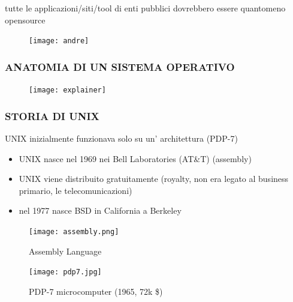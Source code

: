 \documentclass{beamer}
\begin{document}
\begin{frame}
tutte le applicazioni/siti/tool di enti pubblici  dovrebbero essere quantomeno opensource   
    \begin{figure}
        \texttt{[image: andre]}
    \end{figure}
\end{frame}

\begin{frame}
    \frametitle{ANATOMIA DI UN SISTEMA OPERATIVO}
    \begin{figure}
        \texttt{[image: explainer]}
    \end{figure}
\end{frame}

\begin{frame}
\end{frame}

\begin{frame}
    \frametitle{STORIA DI UNIX}
        UNIX inizialmente funzionava solo su un' architettura (PDP-7)
        \vspace{10mm}
        \begin{itemize} 
            \item UNIX nasce nel 1969 nei Bell Laboratories (AT\&T) (assembly)
            \item UNIX viene distribuito gratuitamente (royalty, non era legato al business primario, le telecomunicazioni)
            \item nel 1977 nasce BSD in California a Berkeley
        \end{itemize}
\end{frame}

\begin{frame}
    \begin{figure}
        \begin{center}
            \texttt{[image: assembly.png]}
            \caption {Assembly Language}
        \end{center}
    \end{figure}
\end{frame}

\begin{frame}
    \begin{figure}
        \begin{center}
        \texttt{[image: pdp7.jpg]}
        \caption{PDP-7 microcomputer (1965, 72k \$)}
        \end{center}
    \end{figure}
\end{frame}
\end{document}
